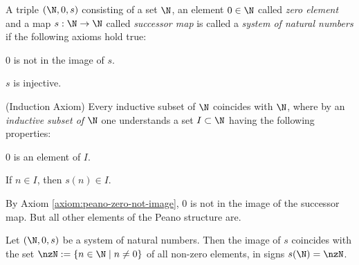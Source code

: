 

\begin{definition}[Peano]
\label{definition:system-of-natural-numbers}
A triple $ (\N,0,s) $ consisting of a set $\N$, an element $0\in \N$ 
called \emph{zero element} and a map $s: \N \rightarrow \N $ 
called \emph{successor map} is called a \emph{system of natural numbers} 
if  the following axioms hold true:

\begin{axiomlist}[P]
\item
\label{axiom:peano-zero-not-image}
  $ 0 $ is not in the image of $ s $.
\item
\label{axiom:peano-injectivity-successor}
  $ s $ is injective.
\item (Induction Axiom)
\label{axiom:peano-induction}
  Every inductive subset of $ \N $ coincides with $ \N $, where 
  by an \emph{inductive subset of} $ \N$ one understands a set $I \subset \N$ 
  having the following properties: 
  \begin{axiomlist}[I]
  \item
    $ 0 $ is an element of $ I $.
  \item
    If $ n \in I $, then $ s (n) \in I $. 
  \end{axiomlist}
\end{axiomlist}
\end{definition}

By Axiom \ref{axiom:peano-zero-not-image}, $0$ is not in the image of the 
successor map. But all other elements of the Peano structure are. 

\begin{proposition}
\label{prop:image-successor-map}
  Let $ (\N,0,s) $ be a system of natural numbers. Then the image of $s$ 
  coincides with the set $\nzN:=\{ n \in \N \mid n \neq 0 \}$ of all 
  non-zero elements, in signs $s (\N)  = \nzN$.
\end{proposition}


